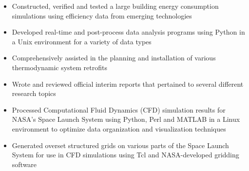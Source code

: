 \documentclass[10pt,a4paper,ragged2e]{altacv}
\begin{document}
\divider

\begin{itemize}
  \item Constructed, verified and tested a large building energy consumption simulations using efficiency data from emerging technologies 
\end{itemize}

\begin{itemize}
  \item Developed real-time and post-process data analysis programs using Python in a Unix environment for a variety of data types
  \item Comprehensively assisted in the planning and installation of various thermodynamic system retrofits
  \item Wrote and reviewed official interim reports that pertained to several different research topics
\end{itemize}

\divider

\begin{itemize}
  \item Processed Computational Fluid Dynamics (CFD) simulation results for NASA's Space Launch System using Python, Perl and MATLAB in a Linux environment to optimize data organization and visualization techniques 
  \item Generated overset structured grids on various parts of the Space Launch System for use in CFD simulations using Tcl and NASA-developed gridding software
\end{itemize}

\clearpage

\nocite{*}
\end{document}

